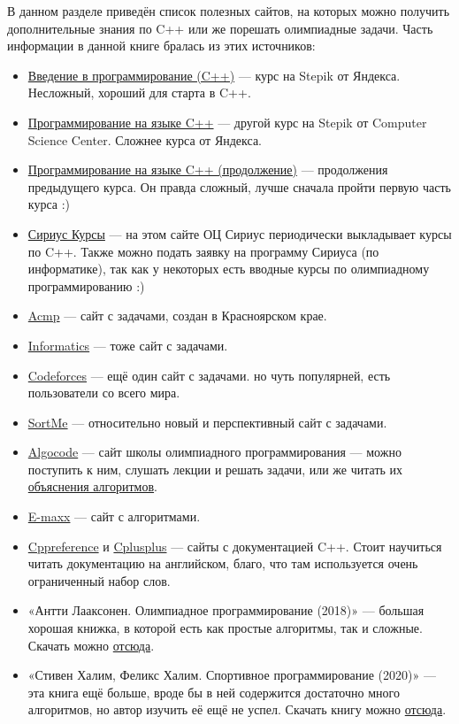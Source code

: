 \hypertarget{0.5}{}
В данном разделе приведён список полезных сайтов, на которых можно получить дополнительные знания по C++ или же порешать олимпиадные задачи. Часть информации в данной книге бралась из этих источников:

\begin{itemize}
    \item \href{https://stepik.org/course/363/}{Введение в программирование (C++)} — курс на Stepik от Яндекса. Несложный, хороший для старта в C++.
    \item \href{https://stepik.org/course/7/}{Программирование на языке C++} — другой курс на Stepik от Computer Science Center. Сложнее курса от Яндекса.
    \item \href{https://stepik.org/course/3206/}{Программирование на языке C++ (продолжение)} — продолжения предыдущего курса. Он правда сложный, лучше сначала пройти первую часть курса :)
    \item \href{https://edu.sirius.online/}{Сириус Курсы} — на этом сайте ОЦ Сириус периодически выкладывает курсы по C++. Также можно подать заявку на программу Сириуса (по информатике), так как у некоторых есть вводные курсы по олимпиадному программированию :)
    \item \href{https://acmp.ru/}{Acmp} — сайт с задачами, создан в Красноярском крае.
    \item \href{https://informatics.msk.ru/}{Informatics} — тоже сайт с задачами.
    \item \href{https://codeforces.com/}{Codeforces} — ещё один сайт с задачами. но чуть популярней, есть пользователи со всего мира.
    \item \href{https://sort-me.org/}{SortMe} — относительно новый и перспективный сайт с задачами.
    \item \href{https://algocode.ru/}{Algocode} — сайт школы олимпиадного программирования  — можно поступить к ним, слушать лекции и решать задачи, или же читать их \href{https://wiki.algocode.ru/}{объяснения алгоритмов}.
    \item \href{https://e-maxx.ru/algo/}{E-maxx} — сайт с алгоритмами.
    \item \href{https://ru.cppreference.com/w/}{Cppreference} и \href{https://cplusplus.com/reference/}{Cplusplus} — сайты с документацией C++. Стоит научиться читать документацию на английском, благо, что там используется очень ограниченный набор слов.
    \item «Антти Лааксонен. Олимпиадное программирование (2018)» — большая хорошая книжка, в которой есть как простые алгоритмы, так и сложные. Скачать можно \href{https://drive.google.com/file/d/13RWpaWUpPlMzVGGMzvMm6cjCxWzYzolI/view?usp=sharing}{отсюда}.
    \item «Стивен Халим, Феликс Халим. Спортивное программирование (2020)» — эта книга ещё больше, вроде бы в ней содержится достаточно много алгоритмов, но автор изучить её ещё не успел. Скачать книгу можно \href{https://drive.google.com/file/d/1TS8rambgTvplQ1Xpxl_GTbGZ3O9liV9C/view?usp=sharing}{отсюда}.
\end{itemize}
